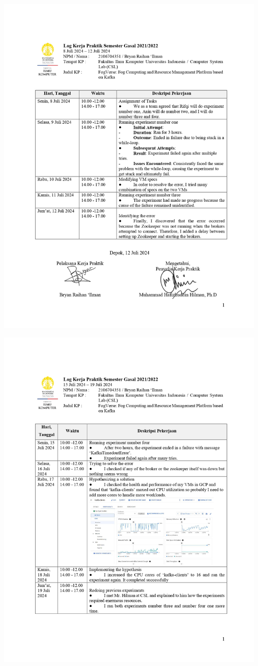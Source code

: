 \includegraphics[width=1\textwidth]{assets/pics/Log-6-CSL-Bryan Raihan Ilman-0001.jpg}

\includegraphics[width=1\textwidth]{assets/pics/Log-7-CSL-Bryan Raihan Ilman-0001.jpg}

